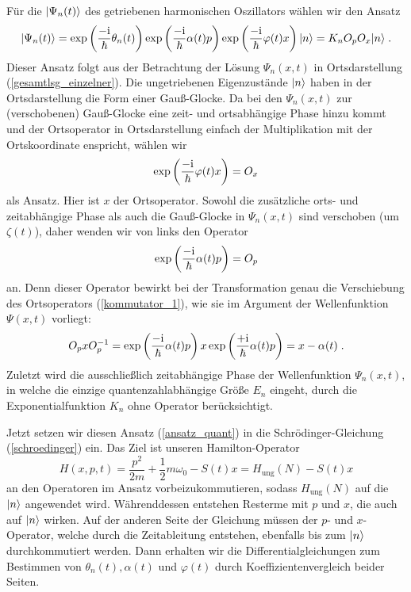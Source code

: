   Für die $\lvert\Psi_n(t)\rangle$ des getriebenen harmonischen Oszillators wählen wir den Ansatz
  \begin{equation}
    \lvert\Psi_n(t)\rangle=\exp\left(\frac{-\text i}{\hbar}\theta_n(t)\right)\exp\left(\frac{-\text i}{\hbar}\alpha(t)p\right)\exp\left(\frac{-\text i}{\hbar}\varphi(t)x\right)\lvert n\rangle=K_nO_pO_x\lvert n\rangle \;.
    \label{ansatz_quant}
  \end{equation}
  Dieser Ansatz folgt aus der Betrachtung der Lösung $\Psi_n(x,t)$ in Ortsdarstellung (\ref{gesamtlsg_einzelner}).
  Die ungetriebenen Eigenzustände $\lvert n\rangle$ haben in der Ortsdarstellung die Form einer Gauß-Glocke.
  Da bei den $\Psi_n(x,t)$ zur (verschobenen) Gauß-Glocke eine zeit- und ortsabhängige Phase hinzu kommt und der Ortsoperator in Ortsdarstellung einfach der Multiplikation mit der Ortskoordinate enspricht, wählen wir
  \begin{equation}
    \exp\left(\frac{-\text i}{\hbar}\varphi(t)x\right)=O_x
  \end{equation}
  als Ansatz.
  Hier ist $x$ der Ortsoperator.
  Sowohl die zusätzliche orts- und zeitabhängige Phase als auch die Gauß-Glocke in $\Psi_n(x,t)$ sind verschoben (um $\zeta(t)$), daher wenden wir von links den Operator
  \begin{equation}
    \exp\left(\frac{-\text i}{\hbar}\alpha(t)p\right)=O_p
  \end{equation}
  an.
  Denn dieser Operator bewirkt bei der Transformation genau die Verschiebung des Ortsoperators (\ref{kommutator_1}), wie sie im Argument der Wellenfunktion $\Psi(x,t)$ vorliegt:
  \begin{equation}
    O_pxO_p^{-1}=
    \exp\left(\frac{-\text i}{\hbar}\alpha(t)p\right) x  \exp\left(\frac{+\text i}{\hbar}\alpha(t)p\right)
    =x-\alpha(t) \; .
    \label{verschiebung_x}
  \end{equation}
  Zuletzt wird die ausschließlich zeitabhängige Phase der Wellenfunktion $\Psi_n(x,t)$, in welche die einzige quantenzahlabhängige Größe $E_n$ eingeht, durch die Exponentialfunktion $K_n$ ohne Operator berücksichtigt.

  Jetzt setzen wir diesen Ansatz (\ref{ansatz_quant}) in die Schrödinger-Gleichung (\ref{schroedinger}) ein.
  Das Ziel ist unseren Hamilton-Operator
  \begin{equation}
    H(x,p,t)=\frac{p^2}{2m}+\frac 1 2 m\omega_0 -S(t)x = H_{\text{ung}}(N)-S(t)x
  \end{equation}
  an den Operatoren im Ansatz vorbeizukommutieren, sodass $H_{\text{ung}}(N)$ auf die $\lvert n\rangle$ angewendet wird.
  Währenddessen entstehen Resterme mit $p$ und $x$, die auch auf $\lvert n\rangle$ wirken.
  Auf der anderen Seite der Gleichung müssen der $p$- und $x$-Operator, welche durch die Zeitableitung entstehen, ebenfalls bis zum $\lvert n\rangle$ durchkommutiert werden.
  Dann erhalten wir die Differentialgleichungen zum Bestimmen von $\theta_n(t), \alpha(t)$ und $\varphi(t)$ durch Koeffizientenvergleich beider Seiten.

